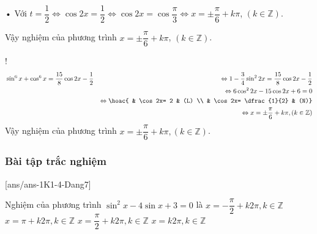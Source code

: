 \begin{bt}
{\begin{listEX}[2]
			• Với $t=\dfrac{1}{2}\Leftrightarrow 
			\cos 2x=\dfrac{1}{2}\Leftrightarrow 
			\cos 2x=\cos \dfrac{\pi}{3}\Leftrightarrow 
			x=\pm \dfrac{\pi}{6}+k\pi $, $( k\in \mathbb{Z})$.
			
			Vậy nghiệm của phương trình $x=\pm \dfrac{\pi}{6}+k\pi$, $( k\in \mathbb{Z})$.
			\item! 
			\begin{eqnarray*}
				&\sin^6x + \cos^6x = \dfrac{15}{8} \cos 2x - \dfrac{1}{2}
				&\Leftrightarrow 1-\dfrac{3}{4}\sin^22x= \dfrac{15}{8} \cos 2x - \dfrac{1}{2}\\
				&&\Leftrightarrow 6\cos^2 2x-15\cos 2x+6=0\\
				&&\Leftrightarrow 
				\hoac{ & \cos 2x= 2 & (L) \\ & \cos 2x= \dfrac{1}{2} & (N)}\\
				&&\Leftrightarrow x=\pm \dfrac{\pi}{6}+k\pi, (k\in \mathbb{Z})
			\end{eqnarray*}
			Vậy nghiệm của phương trình  
			$  x=\pm \dfrac{\pi}{6}+k\pi, (k\in \mathbb{Z})$. 
		\end{listEX}
	}
\end{bt}

\subsubsection{Bài tập trắc nghiệm}
[ans/ans-1K1-4-Dang7]

\begin{ex}%
	Nghiệm của phương trình $\sin^2x-4\sin x+3=0$ là
	\choice
	{$x=-\dfrac{\pi}{2}+k2\pi, k\in\mathbb{Z}$}
	{$x=\pi+k2\pi, k\in\mathbb{Z}$}
	{\True $x=\dfrac{\pi}{2}+k2\pi, k\in\mathbb{Z}$}
	{$x=k2\pi, k\in\mathbb{Z}$}
\end{ex}


